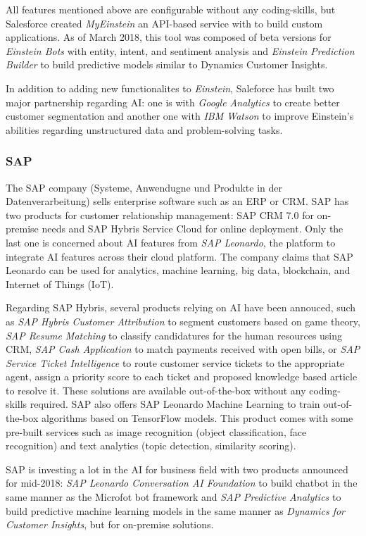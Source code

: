 All features mentioned above are configurable without any coding-skills, but Salesforce created \textit{MyEinstein} an API-based service with to build custom applications. As of March 2018, this tool was composed of beta versions for \textit{Einstein Bots} with entity, intent, and sentiment analysis and \textit{Einstein Prediction Builder} to build predictive models similar to Dynamics Customer Insights.

In addition to adding new functionalites to \textit{Einstein}, Saleforce has built two major partnership regarding AI: one is with \textit{Google Analytics} to create better customer segmentation and another one with \textit{IBM Watson} to improve Einstein's abilities regarding unstructured data and problem-solving tasks.

\subsubsection*{SAP}
The SAP company (Systeme, Anwendugne und Produkte in der Datenverarbeitung) sells enterprise software such as an ERP or CRM. SAP has two products for customer relationship management: SAP CRM 7.0 for on-premise needs and SAP Hybris Service Cloud for online deployment. Only the last one is concerned about AI features from \textit{SAP Leonardo}, the platform to integrate AI features across their cloud platform. The company claims that SAP Leonardo can be used for analytics, machine learning, big data, blockchain, and Internet of Things (IoT).

Regarding SAP Hybris, several products relying on AI have been annouced, such as \textit{SAP Hybris Customer Attribution} to segment customers based on game theory, \textit{SAP Resume Matching} to classify candidatures for the human resources using CRM, \textit{SAP Cash Application} to match payments received with open bills, or \textit{SAP Service Ticket Intelligence} to route customer service tickets to the appropriate agent, assign a priority score to each ticket and proposed knowledge based article to resolve it. These solutions are available out-of-the-box without any coding-skills required. SAP also offers SAP Leonardo Machine Learning to train out-of-the-box algorithms based on TensorFlow models. This product comes with some pre-built services such as image recognition (object classification, face recognition) and text analytics (topic detection, similarity scoring). 

SAP is investing a lot in the AI for business field with two products announced for mid-2018: \textit{SAP Leonardo Conversation AI Foundation} to build chatbot in the same manner as the Microfot bot framework and \textit{SAP Predictive Analytics} to build predictive machine learning models in the same manner as \textit{Dynamics for Customer Insights}, but for on-premise solutions.


